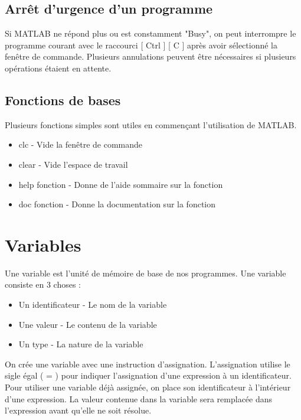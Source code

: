 \documentclass{tufte-handout}
\begin{document}
\subsection{Arrêt d'urgence d'un programme}
Si MATLAB ne répond plus ou est constamment "Busy", on peut interrompre le programme courant avec le raccourci [ Ctrl ] [ C ] après avoir sélectionné la fenêtre de commande. Plusieurs annulations peuvent être nécessaires si plusieurs opérations étaient en attente.
\subsection{Fonctions de bases}
Plusieurs fonctions simples sont utiles en commençant l'utilisation de MATLAB.
\begin{itemize}
    \item clc - Vide la fenêtre de commande
    \item clear - Vide l'espace de travail
    \item help fonction - Donne de l'aide sommaire sur la fonction
    \item doc fonction - Donne la documentation sur la fonction
\end{itemize}

\section{Variables}
Une variable est l'unité de mémoire de base de nos programmes. Une variable consiste en 3 choses :
\begin{itemize}
    \item Un identificateur - Le nom de la variable
    \item Une valeur - Le contenu de la variable
    \item Un type - La nature de la variable
\end{itemize}
On crée une variable avec une instruction d'assignation. L'assignation utilise le sigle égal ( = ) pour indiquer l'assignation d'une expression à un identificateur.
Pour utiliser une variable déjà assignée, on place son identificateur à l'intérieur d'une expression. La valeur contenue dans la variable sera remplacée dans l'expression avant qu'elle ne soit résolue.
\end{document}
